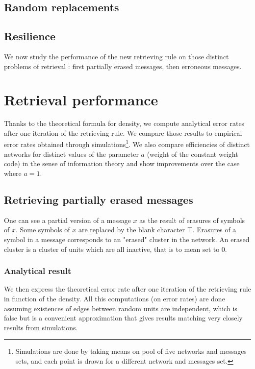 \documentclass[english,10pt,twocolumn]{IEEEtran}
\theoremstyle{definition}
\begin{document}
	\subsection{Random replacements}
	
	\subsection{Resilience}
	
	
	
	We now study the performance of the new retrieving rule on those distinct problems of retrieval : first partially erased messages, then erroneous messages.%
	
	\section{Retrieval performance}	
	
	Thanks to the theoretical formula for density, we compute analytical error rates after one iteration of the retrieving rule. We compare those results to empirical error rates obtained through simulations\footnote{Simulations are done by taking means on pool of five networks and messages sets, and each point is drawn for a different network and messages set.}. We also compare efficiencies of distinct networks for distinct values of the parameter $a$ (weight of the constant weight code) in the sense of information theory and show improvements over the case where $a = 1$.
	
	
	
		
	
	\subsection{Retrieving partially erased messages}		
		
	One can see a partial version of a message $x$ as the result of erasures of symbols of $x$. Some symbols of $x$ are replaced by the blank character $\intercal$.	Erasures of a symbol in a message corresponds to an "erased" cluster in the network. An erased cluster is a cluster of units which are all inactive, that is to mean set to $0$.
	
	\subsubsection{Analytical result}
	
	We then express the theoretical error rate after one iteration of the retrieving rule in function of the density. All this computations (on error rates) are done assuming existences of edges between random units are independent, which is false but is a convenient approximation that gives results matching very closely results from simulations.
	
\end{document}
